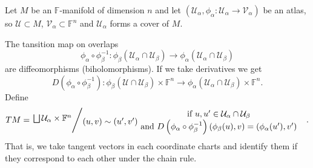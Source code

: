 \begin{example}
  Let $M$ be an $\mathbb{F}$-manifold of dimension $n$ and let $\left( \mathcal{U}_\alpha,\phi_\alpha:\mathcal{U}_\alpha\to \mathcal{V}_\alpha \right) $ be an atlas, so $\mathcal{U}\subset M$, $\mathcal{V}_{\alpha}\subset \mathbb{F}^{n}$ and $\mathcal{U}_\alpha$ forms a cover of $M$.

  The tansition map on overlaps 
  \[
    \phi_{\alpha}\circ \phi_{\beta }^{-1}:\phi_{\beta }\left( \mathcal{U}_\alpha \cap \mathcal{U}_\beta  \right) \to \phi_\alpha\left( \mathcal{U}_\alpha \cap  \mathcal{U}_\beta  \right) 
  \] 
  are diffeomorphisms (biholomorphisms). If we take derivatives we get
  \[
    D\left( \phi_\alpha\circ \phi_{\beta }^{-1} \right) :\phi_\beta\left( \mathcal{U}\cap \mathcal{U}_\beta  \right) \times \mathbb{F}^{n}\to \phi_\alpha \left( \mathcal{U}_\alpha \cap  \mathcal{U}_\beta  \right) \times \mathbb{F}^{n}.
  \] 
Define 
\[
  TM= \sfrac{\bigsqcup \mathcal{U}_\alpha \times \mathbb{F}^{n}}{(u,v)\sim (u',v') \begin{matrix}\text{ if } u,u' \in \mathcal{U}_\alpha \cap \mathcal{U}_{\beta }& \\ \text{ and } D\left( \phi_{\alpha}\circ \phi_{\beta}^{-1} \right)\left( \phi_\beta (u),v \right) =\left( \phi_\alpha (u'),v' \right)&\end{matrix}  } .
\]
That is, we take tangent vectors in each coordinate charts and identify them if they correspond to each other under the chain rule.
\end{example}

